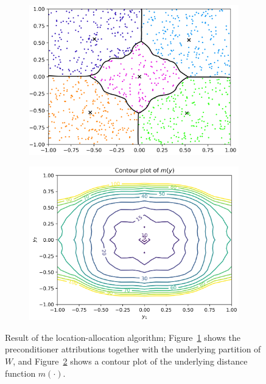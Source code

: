 \begin{figure}
    \centering
    \begin{subfigure}{0.50\textwidth}
        \includegraphics[width=\linewidth]{6-chapter/figures/vor_lines2}
        \caption{} \label{fig:1a}
    \end{subfigure}%
    \begin{subfigure}{0.50\textwidth}
        \includegraphics[width=\linewidth]{6-chapter/figures/contour2}
        \caption{} \label{fig:1b}
    \end{subfigure}%
    \caption{Result of the location-allocation algorithm; Figure~\ref{fig:1a} shows the preconditioner attributions together with the underlying partition of $W$, and Figure~\ref{fig:1b} shows a contour plot of the underlying distance function $m(\cdot)$.}
    \label{fig:voronoi_diagram}
\end{figure}

